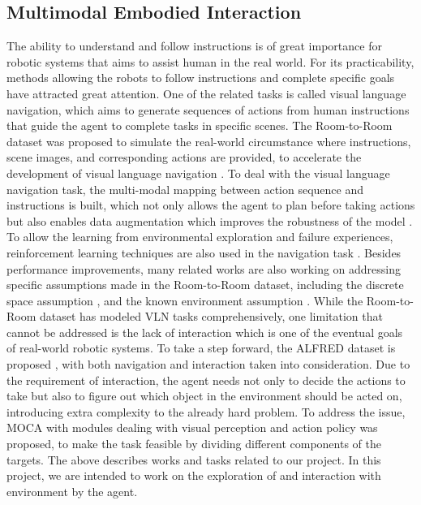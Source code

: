 \documentclass[11pt,a4paper]{article}
\begin{document}
\subsection{Multimodal Embodied Interaction}
The ability to understand and follow instructions is of great importance for robotic systems that aims to assist human in the real world. For its practicability, methods allowing the robots to follow instructions and complete specific goals have attracted great attention. One of the related tasks is called visual language navigation, which aims to generate sequences of actions from human instructions that guide the agent to complete tasks in specific scenes. The Room-to-Room dataset was proposed to simulate the real-world circumstance where instructions, scene images, and corresponding actions are provided, to accelerate the development of visual language navigation \cite{anderson2018_a}. To deal with the visual language navigation task, the multi-modal mapping between action sequence and instructions is built, which not only allows the agent to plan before taking actions but also enables data augmentation which improves the robustness of the model \cite{fried2018_a}. To allow the learning from environmental exploration and failure experiences, reinforcement learning techniques are also used in the navigation task \cite{ma2019_a, wang2018_a}. Besides performance improvements, many related works are also working on addressing specific assumptions made in the Room-to-Room dataset, including the discrete space assumption \cite{krantz2020_a}, and the known environment assumption \cite{tan2019_a}. While the Room-to-Room dataset has modeled VLN tasks comprehensively, one limitation that cannot be addressed is the lack of interaction which is one of the eventual goals of real-world robotic systems. To take a step forward, the ALFRED dataset is proposed \cite{shridhar_a}, with both navigation and interaction taken into consideration. Due to the requirement of interaction, the agent needs not only to decide the actions to take but also to figure out which object in the environment should be acted on, introducing extra complexity to the already hard problem. To address the issue, MOCA \cite{singh2020moca} with modules dealing with visual perception and action policy was proposed, to make the task feasible by dividing different components of the targets. The above describes works and tasks related to our project. In this project, we are intended to work on the exploration of and interaction with environment by the agent.

\clearpage



\end{document}
